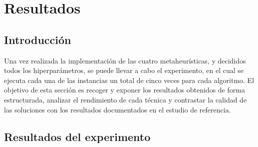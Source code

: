 %
%
%
% 
%
%
%
%

\chapter{Resultados}
\label{cha:resultados}

\section{Introducción}
\label{sec:intro-results}

Una vez realizada la implementación de las cuatro metaheurísticas, y decididos todos los hiperparámetros, se puede llevar a cabo
el experimento, en el cual se ejecuta cada una de las instancias un total de cinco veces para cada algoritmo. El objetivo de esta
sección es recoger y exponer los resultados obtenidos de forma estructurada, analizar el rendimiento de cada técnica y contrastar
la calidad de las soluciones con los resultados documentados en el estudio de referencia.

\section{Resultados del experimento}
\label{sec:exp-results}

